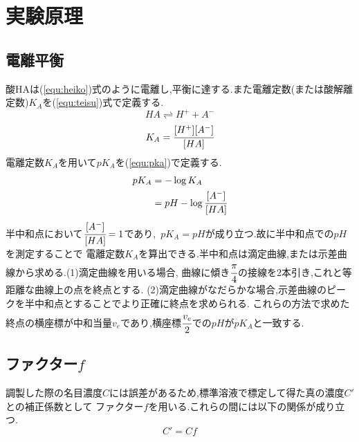 \section{実験原理}
\subsection{電離平衡}
酸HAは(\ref{equ:heiko})式のように電離し,平衡に達する.また電離定数(または酸解離定数)$K_A$を(\ref{equ:teisu})式で定義する.
\begin{equation}
  \label{equ:heiko}
  HA\rightleftharpoons H^+ + A^-
\end{equation}
\begin{equation}
  \label{equ:teisu}
  K_A=\cfrac{[H^+][A^-]}{[HA]}
\end{equation}
電離定数$K_A$を用いて$pK_A$を(\ref{equ:pka})で定義する.
\begin{align}
  \label{equ:pka}
  \begin{aligned}
    pK_A&=-\log K_A\\
    &=pH-\log \cfrac{[A^-]}{[HA]}
  \end{aligned}
\end{align}
半中和点において$\cfrac{[A^-]}{[HA]}=1$であり,\ $pK_A=pH$が成り立つ.故に半中和点での$pH$を測定することで
電離定数$K_A$を算出できる.半中和点は滴定曲線,または示差曲線から求める.(1)滴定曲線を用いる場合,
曲線に傾き$\cfrac{\pi}{4}$の接線を2本引き,これと等距離な曲線上の点を終点とする.
(2)滴定曲線がなだらかな場合,示差曲線のピークを半中和点とすることでより正確に終点を求められる.
これらの方法で求めた終点の横座標が中和当量$v_e$であり,横座標$\cfrac{v_e}{2}$での$pH$が$pK_A$と一致する.
\subsection{ファクター$f$}
調製した際の名目濃度$C$には誤差があるため,標準溶液で標定して得た真の濃度$C'$との補正係数として
ファクター$f$を用いる.これらの間には以下の関係が成り立つ.
\begin{equation}
  \label{equ:factor}
  C'=Cf
\end{equation}
\newpage
